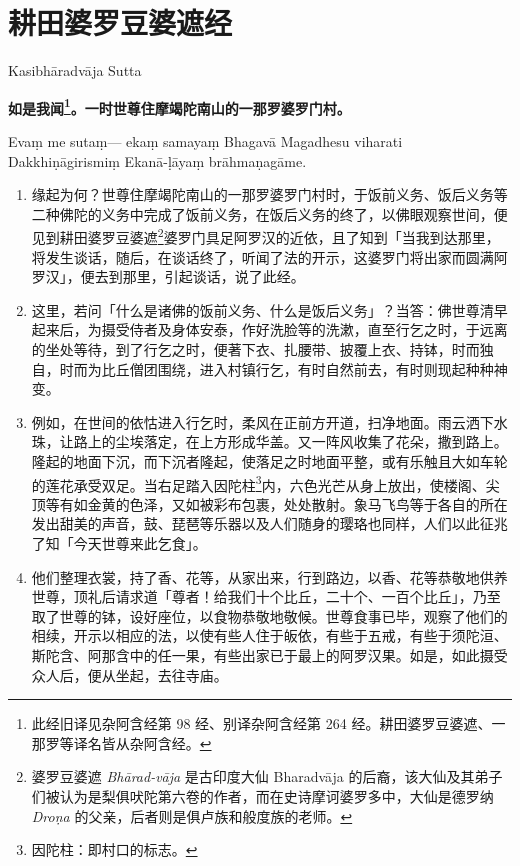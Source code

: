 \section{耕田婆罗豆婆遮经}

\begin{center}Kasibhāradvāja Sutta\end{center}\vspace{1em}

\textbf{如是我闻\footnote{此经旧译见杂阿含经第 98 经、别译杂阿含经第 264 经。耕田婆罗豆婆遮、一那罗等译名皆从杂阿含经。}。一时世尊住摩竭陀南山的一那罗婆罗门村。}

Evaṃ me sutaṃ— ekaṃ samayaṃ Bhagavā Magadhesu viharati Dakkhiṇāgirismiṃ Ekanā-ḷāyaṃ brāhmaṇagāme.

\begin{enumerate}\item 缘起为何？世尊住摩竭陀南山的一那罗婆罗门村时，于饭前义务、饭后义务等二种佛陀的义务中完成了饭前义务，在饭后义务的终了，以佛眼观察世间，便见到耕田婆罗豆婆遮\footnote{婆罗豆婆遮 \textit{Bhārad-vāja} 是古印度大仙 Bharadvāja 的后裔，该大仙及其弟子们被认为是梨俱吠陀第六卷的作者，而在史诗摩诃婆罗多中，大仙是德罗纳 \textit{Droṇa} 的父亲，后者则是俱卢族和般度族的老师。}婆罗门具足阿罗汉的近依，且了知到「当我到达那里，将发生谈话，随后，在谈话终了，听闻了法的开示，这婆罗门将出家而圆满阿罗汉」，便去到那里，引起谈话，说了此经。
\item 这里，若问「什么是诸佛的饭前义务、什么是饭后义务」？当答：佛世尊清早起来后，为摄受侍者及身体安泰，作好洗脸等的洗漱，直至行乞之时，于远离的坐处等待，到了行乞之时，便著下衣、扎腰带、披覆上衣、持钵，时而独自，时而为比丘僧团围绕，进入村镇行乞，有时自然前去，有时则现起种种神变。
\item 例如，在世间的依怙进入行乞时，柔风在正前方开道，扫净地面。雨云洒下水珠，让路上的尘埃落定，在上方形成华盖。又一阵风收集了花朵，撒到路上。隆起的地面下沉，而下沉者隆起，使落足之时地面平整，或有乐触且大如车轮的莲花承受双足。当右足踏入因陀柱\footnote{因陀柱：即村口的标志。}内，六色光芒从身上放出，使楼阁、尖顶等有如金黄的色泽，又如被彩布包裹，处处散射。象马飞鸟等于各自的所在发出甜美的声音，鼓、琵琶等乐器以及人们随身的璎珞也同样，人们以此征兆了知「今天世尊来此乞食」。
\item 他们整理衣裳，持了香、花等，从家出来，行到路边，以香、花等恭敬地供养世尊，顶礼后请求道「尊者！给我们十个比丘，二十个、一百个比丘」，乃至取了世尊的钵，设好座位，以食物恭敬地敬候。世尊食事已毕，观察了他们的相续，开示以相应的法，以使有些人住于皈依，有些于五戒，有些于须陀洹、斯陀含、阿那含中的任一果，有些出家已于最上的阿罗汉果。如是，如此摄受众人后，便从坐起，去往寺庙。

\end{enumerate}
